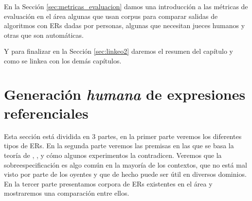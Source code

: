 En la Secci\'on \ref{sec:metricas_evaluacion} damos una introducci\'on a las m\'etricas de evaluaci\'on en el \'area algunas que usan corpus para comparar salidas de algoritmos con ERs dadas por personas, algunas que necesitan jueces humanos y otras que son autom\'aticas. 

Y para finalizar en la Secci\'on \ref{sec:linkeo2} daremos el resumen del cap\'itulo y como se linkea con los dem\'as cap\'itulos.


\section{Generaci\'on \emph{humana} de expresiones referenciales}
\label{generacion-humana}

Esta secci\'on est\'a dividida en 3 partes, en la primer parte veremos los diferentes tipos de ERs. En la segunda parte veremos las premisas en las que se basa la teor\'ia de \cite{Clark-Marshall81}, \cite{clark1992arenas}, y c\'omo algunos experimentos la contradicen. Veremos que la sobreespecificaci\'on es algo com\'un en la mayor\'ia de los contextos, que no est\'a mal visto por parte de los oyentes y que de hecho puede ser \'util en diversos dominios. En la tercer parte presentamos corpora de ERs existentes en el \'area y mostraremos una comparaci\'on entre ellos.


